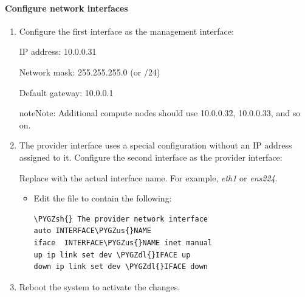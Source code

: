 \documentclass[letterpaper,10pt,english]{sphinxmanual}
\def\PYGZus{\char`\_}
\def\PYGZsh{\char`\#}
\def\PYGZdl{\char`\$}
\begin{document}
\paragraph{Configure network interfaces}
\label{_source/installation_guide/environment-networking-compute:configure-network-interfaces}\begin{enumerate}
\item {} 
Configure the first interface as the management interface:

IP address: 10.0.0.31

Network mask: 255.255.255.0 (or /24)

Default gateway: 10.0.0.1

\begin{notice}{note}{Note:}
Additional compute nodes should use 10.0.0.32, 10.0.0.33, and so on.
\end{notice}

\item {} 
The provider interface uses a special configuration without an IP
address assigned to it. Configure the second interface as the provider
interface:

Replace  with the actual interface name. For example,
\emph{eth1} or \emph{ens224}.
\begin{itemize}
\item {} 
Edit the  file to contain the following:

\begin{Verbatim}[commandchars=\\\{\}]
\PYGZsh{} The provider network interface
auto INTERFACE\PYGZus{}NAME
iface  INTERFACE\PYGZus{}NAME inet manual
up ip link set dev \PYGZdl{}IFACE up
down ip link set dev \PYGZdl{}IFACE down
\end{Verbatim}

\end{itemize}

\item {} 
Reboot the system to activate the changes.

\end{enumerate}
\end{document}
